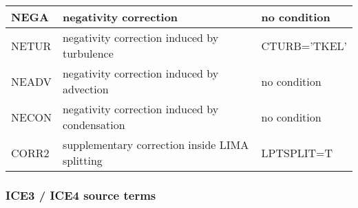 \begin{longtable} {|p{}|p{}|p{}|}
NEGA   & negativity correction                                    & no condition \\\hline
NETUR  & negativity correction induced by turbulence              & CTURB='TKEL' \\\hline
NEADV  & negativity correction induced by advection               & no condition \\\hline
NECON  & negativity correction induced by condensation            & no condition \\\hline
CORR2  & supplementary correction inside LIMA splitting           & LPTSPLIT=T \\\hline
\end{longtable}

\subsubsection{ICE3 / ICE4 source terms}


